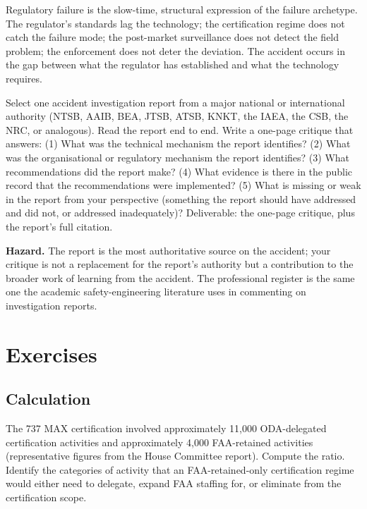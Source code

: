 \begin{archetype}[failure]
Regulatory failure is the slow-time, structural expression of the failure archetype. The regulator's standards lag the technology; the certification regime does not catch the failure mode; the post-market surveillance does not detect the field problem; the enforcement does not deter the deviation. The accident occurs in the gap between what the regulator has established and what the technology requires.
\end{archetype}

\begin{project}
Select one accident investigation report from a major national or international authority (NTSB, AAIB, BEA, JTSB, ATSB, KNKT, the IAEA, the CSB, the NRC, or analogous). Read the report end to end. Write a one-page critique that answers: (1) What was the technical mechanism the report identifies? (2) What was the organisational or regulatory mechanism the report identifies? (3) What recommendations did the report make? (4) What evidence is there in the public record that the recommendations were implemented? (5) What is missing or weak in the report from your perspective (something the report should have addressed and did not, or addressed inadequately)? Deliverable: the one-page critique, plus the report's full citation.

\textbf{Hazard.} The report is the most authoritative source on the accident; your critique is not a replacement for the report's authority but a contribution to the broader work of learning from the accident. The professional register is the same one the academic safety-engineering literature uses in commenting on investigation reports.
\end{project}

\section{Exercises}

\subsection*{Calculation}

\begin{exercise}
The 737 MAX certification involved approximately 11,000 ODA-delegated certification activities and approximately 4,000 FAA-retained activities (representative figures from the House Committee report). Compute the ratio. Identify the categories of activity that an FAA-retained-only certification regime would either need to delegate, expand FAA staffing for, or eliminate from the certification scope.
\end{exercise}

